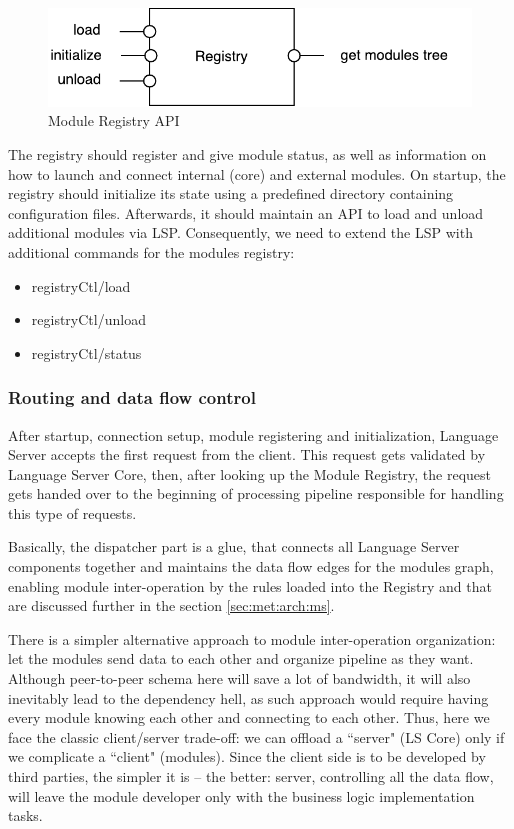 \begin{figure}[H]
    \centering
    \includegraphics[width=.7\textwidth]{figs/registry.pdf}
    \caption{Module Registry API}
\end{figure}

\newpage
The registry should register and give module status, as well as information on how to launch and connect
internal (core) and external modules. On startup, the registry should initialize its state using a predefined directory
containing configuration files. Afterwards, it should maintain an API to load and unload additional modules via LSP.
Consequently, we need to extend the LSP with additional commands for the modules registry:

\begin{itemize}
    \item registryCtl/load
    \item registryCtl/unload
    \item registryCtl/status
\end{itemize}

\subsubsection{Routing and data flow control}
\label{sec:met:arch:core:dispatcher}

After startup, connection setup, module registering and initialization, 
Language Server accepts the first request from the client. 
This request gets validated by Language Server Core, then, after looking up the Module Registry, the request 
gets handed over to the beginning of processing pipeline responsible for handling this type of requests.

Basically, the dispatcher part is a glue, that connects all Language Server components together and 
maintains the data flow edges for the modules graph, enabling module inter-operation by the
rules loaded into the Registry and that are discussed further in the section \ref{sec:met:arch:ms}.

There is a simpler alternative approach to module inter-operation organization: let the modules send data to each other and organize pipeline as they want. Although peer-to-peer schema here will save a lot of bandwidth, 
it will also inevitably lead to the dependency hell, 
as such approach would require having every module knowing each other and connecting to each other. 
Thus, here we face the classic client/server trade-off: we can offload a ``server" (LS Core) only
if we complicate a ``client" (modules). 
Since the client side is to be developed by third parties, the simpler it is -- the better: 
server, controlling all the data flow, will leave the module developer only with the business logic implementation tasks. 

